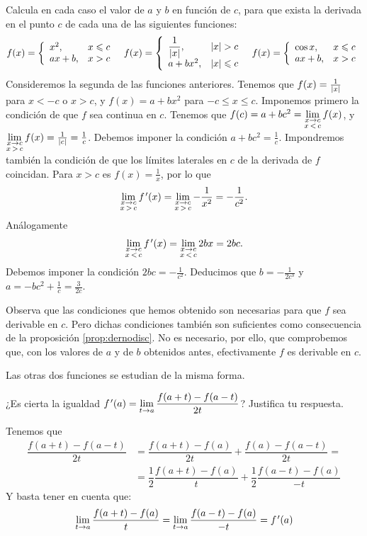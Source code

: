 \begin{ejercicios resueltos}
\resuelto Calcula en cada caso el valor de $a$ y $b$ en función
de $c$, para que exista la derivada en el punto $c$ de cada una
de las siguientes funciones: 
\[
f(x)=\left\{ \begin{array}{ll}
x^{2}, & x\le c\\
ax+b, & x>c
\end{array}\right.\ \ f(x)=\left\{ \begin{array}{ll}
\dfrac{1}{\abs{x}}, & \abs{x}>c\\
a+bx^{2}, & \abs{x}\le c
\end{array}\right.\ \ f(x)=\left\{ \begin{array}{ll}
\cos x, & x\le c\\
ax+b, & x>c
\end{array}\right.
\]
\sol Consideremos la segunda de las funciones anteriores. Tenemos
que $f(x)=\frac{1}{\abs{x}}$ para $x<-c$ o $x>c$, y $f(x)=a+bx^{2}$
para $-c\le x\le c$. Imponemos primero la condición de que $f$ sea
continua en $c$. Tenemos que $f(c)=a+bc^{2}=\limlft{f(x)}{x}{c}$,
y $\limrgt{f(x)}{x}{c}=\frac{1}{\abs{c}}=\frac{1}{c}$. Debemos imponer
la condición $a+bc^{2}=\frac{1}{c}$. Impondremos también la condición
de que los límites laterales en $c$ de la derivada de $f$ coincidan.
Para $x>c$ es $f(x)=\frac{1}{x}$, por lo que 
\[
\limrgt{f\tl(x)}{x}{c}=\limrgt{-\frac{1}{x^{2}}}{x}{c}=-\frac{1}{c^{2}}.
\]
Análogamente 
\[
\limlft{f\tl(x)}{x}{c}=\limlft{2bx}{x}{c}=2bc.
\]
Debemos imponer la condición $2bc=-\frac{1}{c^{2}}$. Deducimos que
$b=-\frac{1}{2c^{3}}$ y $a=-bc^{2}+\frac{1}{c}=\frac{3}{2c}$.

Observa que las condiciones que hemos obtenido son necesarias para
que $f$ sea derivable en $c$. Pero dichas condiciones también son
suficientes como consecuencia de la proposición \ref{prop:dernodisc}.
No es necesario, por ello, que comprobemos que, con los valores de
$a$ y de $b$ obtenidos antes, efectivamente $f$ es derivable en
$c$.

Las otras dos funciones se estudian de la misma forma.\hecho

\resuelto ¿Es cierta la igualdad ${\displaystyle f\tl(a)=\lim_{t\to a}\dfrac{f(a+t)-f(a-t)}{2t}}$?
Justifica tu respuesta.

\sol Tenemos que 
\begin{align*}
\dfrac{f(a+t)-f(a-t)}{2t} & =\dfrac{f(a+t)-f(a)}{2t}+\dfrac{f(a)-f(a-t)}{2t}=\\
 & =\dfrac{1}{2}\dfrac{f(a+t)-f(a)}{t}+\dfrac{1}{2}\dfrac{f(a-t)-f(a)}{-t}
\end{align*}
Y basta tener en cuenta que: 
\[
\lim_{t\to a}\dfrac{f(a+t)-f(a)}{t}=\lim_{t\to a}\dfrac{f(a-t)-f(a)}{-t}=f\tl(a)
\]
\hecho


\end{ejercicios resueltos}
